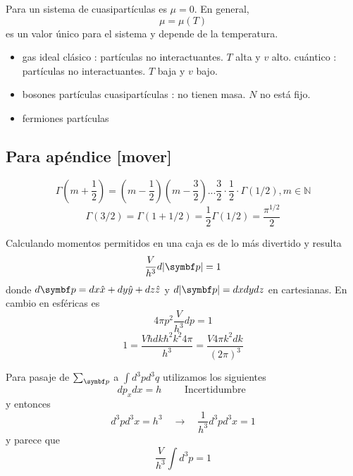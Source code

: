 \documentclass[10pt,oneside]{CBFT_book}
\begin{document}
Para un sistema de cuasipartículas es $\mu=0$. En general,
\[
	\mu = \mu(T)
\]
es un valor único para el sistema y depende de la temperatura.
\begin{itemize}
 \item gas ideal
 \subitem clásico : partículas no interactuantes. $T$ alta y $v$ alto.
 \subitem cuántico : partículas no interactuantes. $T$ baja y $v$ bajo.
 \item bosones 
 \subitem partículas
 \subitem cuasipartículas : no tienen masa. $N$ no está fijo.
 \item fermiones 
 \subitem partículas
\end{itemize}


\subsection{Para apéndice [mover]}

\[
	\Gamma \left( m +\frac{1}{2} \right) = \left( m -\frac{1}{2} \right) \left( m -\frac{3}{2} \right)
	... \frac{3}{2} \cdot \frac{1}{2} \cdot \Gamma(1/2), m \in \mathbb{N}
\]
\[
	\Gamma(3/2) = \Gamma(1+ 1/2) =\frac{1}{2} \Gamma(1/2) = \frac{\pi^{1/2}}{2}
\]

Calculando momentos permitidos en una caja es de lo más divertido y resulta 
\[
	\frac{V}{h^3} d|\vb{p}| = 1 
\]
donde $ d\vb{p} = dx \hat{x} + dy \hat{y}+ dz \hat{z}$ y $ d|\vb{p}| = dx dy dz $   en cartesianas.
En cambio en esféricas es
\[
	4 \pi p^2 \frac{V}{h^3} dp = 1
\]
\[
	1 = \frac{ V \hbar dk \hbar^2 k^2 4 \pi  }{ h^3 } = \frac{V 4\pi k^2 dk}{ (2\pi)^3 }
\]

Para pasaje de $\sum_{\vb{p}}$ a $\int d^3p d^3q $ utilizamos los siguientes 
\[
	dp_x dx  = h \qquad \text{ Incertidumbre }
\]
y entonces 
\[
	d^3p d^3x = h^3 \quad \to \quad \frac{1}{h^3 }d^3p d^3x = 1 
\]
y parece que 
\[
	\frac{V}{h^3} \int d^3 p = 1 
\]

\end{document}
